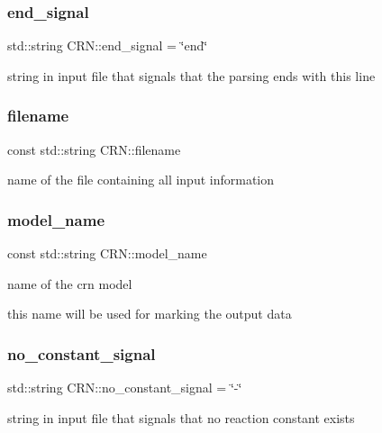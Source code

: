 \subsubsection{\texorpdfstring{end\+\_\+signal}{end\_signal}}
{\footnotesize\ttfamily std\+::string C\+R\+N\+::end\+\_\+signal = \char`\"{}end\char`\"{}}



string in input file that signals that the parsing ends with this line 

\mbox{\label{classCRN_a4ef4514e0ffba7b9358b37636a7f7fb4}} 
\subsubsection{\texorpdfstring{filename}{filename}}
{\footnotesize\ttfamily const std\+::string C\+R\+N\+::filename}



name of the file containing all input information 

\mbox{\label{classCRN_a9ab0e43893870c6961fd0febafc99161}} 
\subsubsection{\texorpdfstring{model\+\_\+name}{model\_name}}
{\footnotesize\ttfamily const std\+::string C\+R\+N\+::model\+\_\+name}



name of the crn model 

this name will be used for marking the output data \mbox{\label{classCRN_addd46160b590b36ba15b6fb91f591758}} 
\subsubsection{\texorpdfstring{no\+\_\+constant\+\_\+signal}{no\_constant\_signal}}
{\footnotesize\ttfamily std\+::string C\+R\+N\+::no\+\_\+constant\+\_\+signal = \char`\"{}-\/\char`\"{}}



string in input file that signals that no reaction constant exists 

